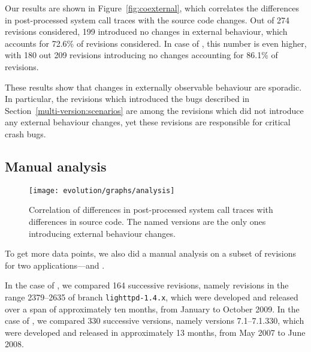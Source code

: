 Our results are shown in Figure~\ref{fig:coexternal}, which correlates the
differences in post-processed system call traces with the source code changes.
Out of 274 \lighttpd revisions considered, 199 introduced no changes in
external behaviour, which accounts for 72.6\% of revisions considered. In case
of \lighttpdtwo, this number is even higher, with 180 out 209 revisions
introducing no changes accounting for 86.1\% of revisions. %

These results show that changes in externally observable behaviour are
sporadic. In particular, the revisions which introduced the bugs described in
Section~\ref{multi-version:scenarios} are among the revisions which did not
introduce any external behaviour changes, yet these revisions are responsible
for critical crash bugs.

\subsection{Manual analysis}

\begin{figure}[t]
  \begin{center}
    \texttt{[image: evolution/graphs/analysis]}
    \caption{Correlation of differences in post-processed system call traces
      with differences in source code. The named versions are the only ones
      introducing external behaviour changes.}
    \label{fig:coanalysis}
  \end{center}
\end{figure}

To get more data points, we also did a manual analysis on a subset of revisions
for two applications---\lighttpd and \vim.

In the case of \lighttpd, we compared 164 successive revisions, namely revisions in
the range 2379--2635 of branch \texttt{lighttpd-1.4.x}, which were developed
and released over a span of approximately ten months, from January to October
2009. In the case of \vim, we compared 330 successive versions, namely versions
7.1--7.1.330, which were developed and released in approximately 13 months,
from May 2007 to June 2008.


